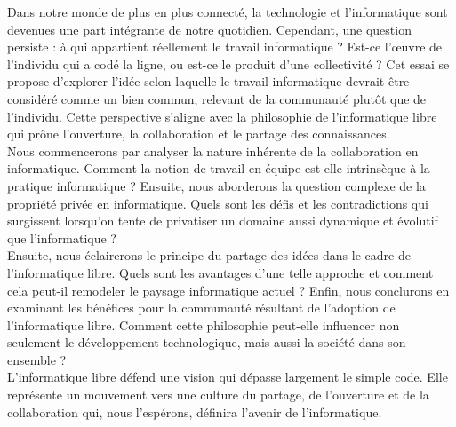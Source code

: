 Dans notre monde de plus en plus connecté, la technologie et l'informatique sont devenues une part intégrante de notre quotidien. Cependant, une question persiste : à qui appartient réellement le travail informatique ? Est-ce l'œuvre de l'individu qui a codé la ligne, ou est-ce le produit d'une collectivité ? Cet essai se propose d'explorer l'idée selon laquelle le travail informatique devrait être considéré comme un bien commun, relevant de la communauté plutôt que de l'individu. Cette perspective s'aligne avec la philosophie de l'informatique libre qui prône l'ouverture, la collaboration et le partage des connaissances.\\

Nous commencerons par analyser la nature inhérente de la collaboration en informatique. Comment la notion de travail en équipe est-elle intrinsèque à la pratique informatique ? Ensuite, nous aborderons la question complexe de la propriété privée en informatique. Quels sont les défis et les contradictions qui surgissent lorsqu'on tente de privatiser un domaine aussi dynamique et évolutif que l'informatique ?\\

Ensuite, nous éclairerons le principe du partage des idées dans le cadre de l'informatique libre. Quels sont les avantages d'une telle approche et comment cela peut-il remodeler le paysage informatique actuel ? Enfin, nous conclurons en examinant les bénéfices pour la communauté résultant de l'adoption de l'informatique libre. Comment cette philosophie peut-elle influencer non seulement le développement technologique, mais aussi la société dans son ensemble ?\\

L'informatique libre défend une vision qui dépasse largement le simple code. Elle représente un mouvement vers une culture du partage, de l'ouverture et de la collaboration qui, nous l'espérons, définira l'avenir de l'informatique.

